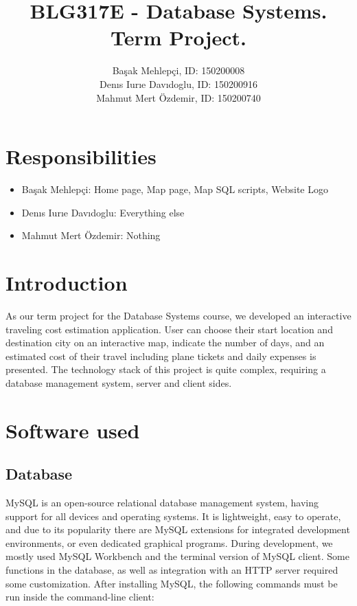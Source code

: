 \documentclass[12pt]{article}
\author{
 Başak Mehlepçi, ID: 150200008 \\
 Denıs Iurıe Davıdoglu, ID: 150200916 \\
 Mahmut Mert Özdemir, ID: 150200740 \\}
\title{BLG317E - Database Systems. Term Project.}
\begin{document}
\maketitle
\tableofcontents

\section{Responsibilities}
\begin{itemize}

\item Başak Mehlepçi: Home page, Map page, Map SQL scripts, Website Logo
\item Denıs Iurıe Davıdoglu: Everything else
\item Mahmut Mert Özdemir: Nothing

\end{itemize}
\section{Introduction}
\label{sec:org0a541b4}
As our term project for the Database Systems course, we developed an interactive traveling cost estimation application. User can choose their start location and destination city on an interactive map, indicate the number of days, and an estimated cost of their travel including plane tickets and daily expenses is presented. The technology stack of this project is quite complex, requiring a database management system, server and client sides. 

\section{Software used}
\label{sec:orgece5d07}
\subsection{Database}
\label{sec:orgadccb32}
MySQL is an open-source relational database management system, having support for all devices and operating systems. It is lightweight, easy to operate, and due to its popularity there are MySQL extensions for integrated development environments, or even dedicated graphical programs. During development, we mostly used MySQL Workbench and the terminal version of MySQL client.
Some functions in the database, as well as integration with an HTTP server required some customization. After installing MySQL, the following commands must be run inside the command-line client:
\end{document}
